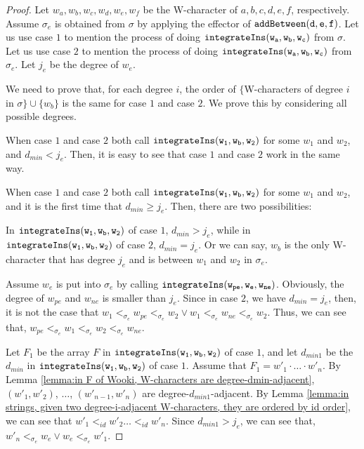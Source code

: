 \begin {proof}
Let $w_a,w_b,w_c,w_d,w_e,w_f$ be the W-character of $a,b,c,d,e,f$, respectively. Assume $\sigma_e$ is obtained from $\sigma$ by applying the effector of $\alabelshort[{\tt addBetween}]{d,e,f}$. Let us use case $1$ to mention the process of doing $\alabelshort[{\tt integrateIns}]{w_a,w_b,w_c}$ from $\sigma$. Let us use case $2$ to mention the process of doing $\alabelshort[{\tt integrateIns}]{w_a,w_b,w_c}$ from $\sigma_e$. Let $j_e$ be the degree of $w_e$.

We need to prove that, for each degree $i$, the order of $\{$W-characters of degree $i$ in $\sigma \} \cup \{ w_b \}$ is the same for case $1$ and case $2$. We prove this by considering all possible degrees.

When case $1$ and case $2$ both call $\alabelshort[{\tt integrateIns}]{w_1,w_b,w_2}$ for some $w_1$ and $w_2$, and $d_{min}<j_e$. Then, it is easy to see that case $1$ and case $2$ work in the same way.

When case $1$ and case $2$ both call $\alabelshort[{\tt integrateIns}]{w_1,w_b,w_2}$ for some $w_1$ and $w_2$, and it is the first time that $d_{min} \geq j_e$. Then, there are two possibilities:

 In $\alabelshort[{\tt integrateIns}]{w_1,w_b,w_2}$ of case $1$, $d_{min} > j_e$, while in $\alabelshort[{\tt integrateIns}]{w_1,w_b,w_2}$ of case $2$, $d_{min} = j_e$. Or we can say, $w_b$ is the only W-character that has degree $j_e$ and is between $w_1$ and $w_2$ in $\sigma_e$.

Assume $w_e$ is put into $\sigma_e$ by calling $\alabelshort[{\tt integrateIns}]{w_{pe},w_e,w_{ne}}$. Obviously, the degree of $w_{pe}$ and $w_{ne}$ is smaller than $j_e$. Since in case $2$, we have $d_{min} = j_e$, then, it is not the case that $w_1 <_{\sigma_e} w_{pe} <_{\sigma_e} w_2 \vee w_1 <_{\sigma_e} w_{ne} <_{\sigma_e} w_2$. Thus, we can see that, $w_{pe} <_{\sigma_e} w_1 <_{\sigma_e} w_2 <_{\sigma_e} w_{ne}$.

Let $F_1$ be the array $F$ in $\alabelshort[{\tt integrateIns}]{w_1,w_b,w_2}$ of case $1$, and let $d_{min1}$ be the $d_{min}$ in $\alabelshort[{\tt integrateIns}]{w_1,w_b,w_2}$ of case $1$. Assume that $F_1 = w'_1 \cdot \ldots \cdot w'_n$. By Lemma \ref{lemma:in F of Wooki, W-characters are degree-dmin-adjacent}, $(w'_1,w'_2)$, $\ldots$, $(w'_{n-1},w'_n)$ are degree-$d_{min1}$-adjacent. By Lemma \ref{lemma:in strings, given two degree-i-adjacent W-characters, they are ordered by id order}, we can see that $w'_1 <_{id} w'_2 \ldots <_{id} w'_n$. Since $d_{min1} > j_e$, we can see that, $w'_n <_{\sigma_e} w_e \vee w_e <_{\sigma_e} w'_1$.


\end{proof}
